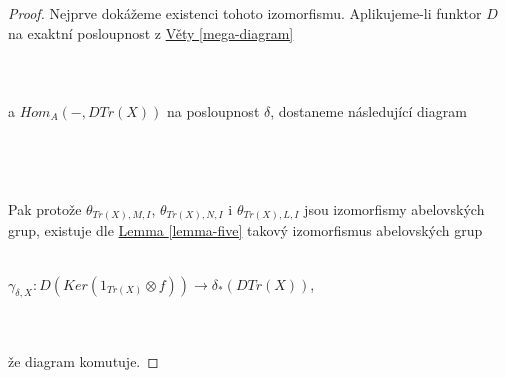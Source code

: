         \begin{proof} 
          Nejprve dokážeme existenci tohoto izomorfismu.
          Aplikujeme-li funktor $D$ na exaktní posloupnost z \hyperref[mega-diagram]{Věty \ref*{mega-diagram}} \\\\
          \\\\
          a $Hom_A(-,DTr(X))$ na posloupnost $\delta$, dostaneme následující diagram \\\\
          \\\\\\
          Pak protože $\theta_{Tr(X),M,I}$, $\theta_{Tr(X),N,I}$ i $\theta_{Tr(X),L,I}$ 
          jsou izomorfismy abelovských grup, existuje dle \hyperref[lemma-five]{Lemma \ref*{lemma-five}} 
          takový   izomorfismus abelovských grup \\\\
          \centerline{$\gamma_{\delta, X}:D(Ker(1_{Tr(X)}\otimes f)) \rightarrow \delta_*(DTr(X))$,} 
          \\\\
          že diagram komutuje.
          

\end{proof}
